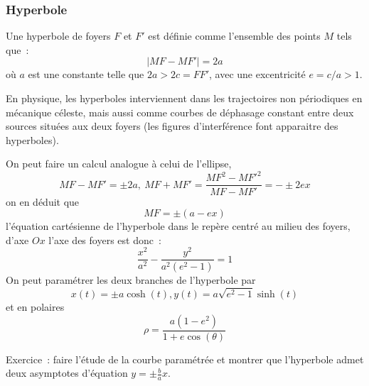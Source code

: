 \documentclass[a4paper,11pt]{article}
\begin{document}
\begin{giacjshere}
\subsubsection{Hyperbole}
Une hyperbole de foyers $F$ et $F'$ est d\'efinie comme l'ensemble
des points $M$ tels que~:
$$ |MF-MF'|=2a$$
o\`u $a$ est une constante telle que $2a>2c=FF'$, avec une excentricit\'e
$e=c/a>1$.

En physique, les hyperboles interviennent dans les trajectoires non
p\'eriodiques en m\'ecanique c\'eleste, mais aussi comme courbes 
de d\'ephasage constant entre deux sources situ\'ees aux deux foyers
(les figures d'interf\'erence font apparaitre des hyperboles).

On peut faire un calcul analogue \`a celui de l'ellipse, 
$$ MF-MF'=\pm 2a, \ MF+MF'=\frac{MF^2-MF'^2}{MF-MF'}=-\pm 2ex$$
on en d\'eduit que
$$ MF=\pm (a-ex)$$
l'\'equation cart\'esienne de l'hyperbole dans le rep\`ere centr\'e au milieu
des foyers, d'axe $Ox$ l'axe des foyers est donc~:
$$ \frac{x^2}{a^2}-\frac{y^2}{a^2(e^2-1)}=1$$
On peut param\'etrer les deux branches de l'hyperbole par
$$ x(t)=\pm a\cosh(t), y(t)=a\sqrt{e^2-1} \sinh(t)$$
et en polaires
$$ \rho=\frac{a(1-e^2)}{1+e\cos(\theta)}$$

Exercice~: faire l'\'etude de la courbe param\'etr\'ee et montrer que
l'hyperbole admet deux asymptotes d'\'equation $y = \pm \frac{b}{a} x$.



\end{giacjshere}
\end{document}
